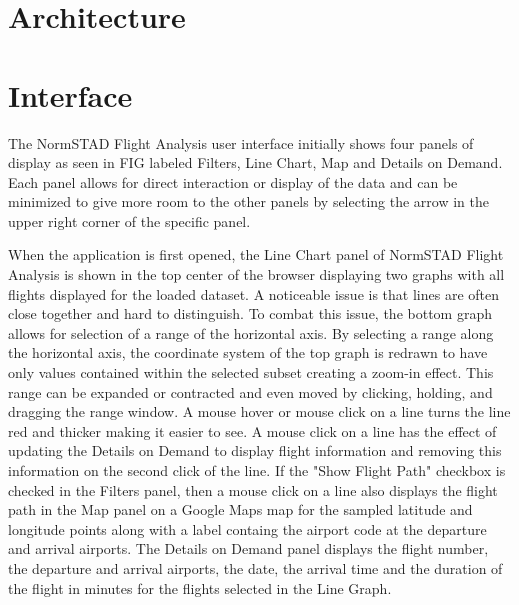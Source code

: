 \documentclass{sig-alternate}
\begin{document}
\section{Architecture}
\label{sec-architecture}

\section{Interface}
\label{sec-interface}

The NormSTAD Flight Analysis user interface initially shows four panels of display as seen in 
FIG labeled Filters, Line Chart, Map and Details on Demand. Each panel allows for 
direct interaction or display of the data and can be minimized to
give more room to the other panels by selecting 
the arrow in the upper right corner of the specific panel. 

When the application is first opened, the Line Chart panel of NormSTAD Flight Analysis is shown in the top
center of the browser displaying two graphs with all flights displayed for the 
loaded dataset. A noticeable issue is that lines are often close together and hard to
distinguish.
 To combat this issue, the bottom graph allows for selection of a range of 
the horizontal axis. By selecting a range along the horizontal axis, the coordinate
system of the top graph is redrawn to have only values contained within the selected subset
creating a zoom-in effect. This range can be expanded or contracted and even moved by clicking,
holding, and dragging the range window. A mouse hover or mouse click on a
line turns the line red and 
thicker making it easier to see. A mouse click on a line has the effect of
updating the Details on Demand
to display flight information and removing this information on the second click of the line. 
If the "Show Flight Path" checkbox is checked in the Filters panel, then a mouse click on a line also displays
the flight path in the Map panel on a Google Maps map for the sampled latitude and longitude points along with a label containg the airport code at the departure and arrival airports.
The Details on Demand panel displays the flight number, the departure and arrival airports, the date,
the arrival time and the duration of the flight in minutes for the flights selected in the
Line Graph.
\end{document}
